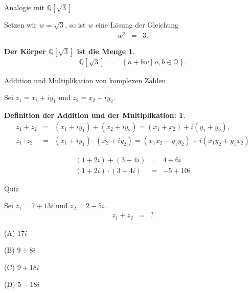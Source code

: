 \documentclass[german]{beamer}
\newcommand{\bq}{\begin{eqnarray*}}
\newcommand{\eq}{\end{eqnarray*}}
\newtheorem*{mytheorem6a}{Der K\"orper $\mathbb{Q}[\sqrt{3}]$ ist die Menge}
\newtheorem*{mytheorem7}{Definition der Addition und der Multiplikation:}
\begin{document}
\begin{frame}{Analogie mit $\mathbb{Q}[\sqrt{3}]$}

\begin{definition}
Setzen wir $w=\sqrt{3}$, so ist $w$ 
eine L\"osung der Gleichung
\bq
 w^2 & = & 3.
\eq
\end{definition}

\begin{mytheorem6a}
\bq
 \mathbb{Q}[\sqrt{3}] & = & \left\{ a+bw \;|\; a,b \in {\mathbb Q} \right\}.
\eq
\end{mytheorem6a}

\end{frame}

\begin{frame}{Addition und Multiplikation von komplexen Zahlen}

Sei $z_1=x_1+iy_1$ und $z_2=x_2+iy_2$.
\begin{mytheorem7}
\bq
 z_1 + z_2 & = & \left( x_1+iy_1 \right) + \left( x_2+iy_2 \right) = \left(x_1+x_2\right) + i \left(y_1+y_2\right),
 \nonumber \\
z_1 \cdot z_2 & = & \left( x_1+iy_1 \right) \cdot \left( x_2+iy_2 \right) 
 = \left(x_1 x_2 - y_1 y_2 \right) + i \left(x_1 y_2 + y_1 x_2 \right)
\eq
\end{mytheorem7}

\begin{example}
\bq
 \left(1+2i\right) + \left(3+4i\right) & = & 4 + 6 i
 \nonumber \\
 \left(1+2i\right) \cdot \left(3+4i\right) & = & -5 + 10 i
\eq
\end{example}

\end{frame}

\begin{frame}{Quiz}

Sei $z_1=7+13i$ und $z_2=2-5i$.
\bq
 z_1+z_2 & = & ?
\eq 
\begin{description}
\item{(A)} $17i$
\item{(B)} $9+8i$
\item{(C)} $9+18i$
\item{(D)} $5-18i$
\end{description}

\end{frame}
\end{document}
